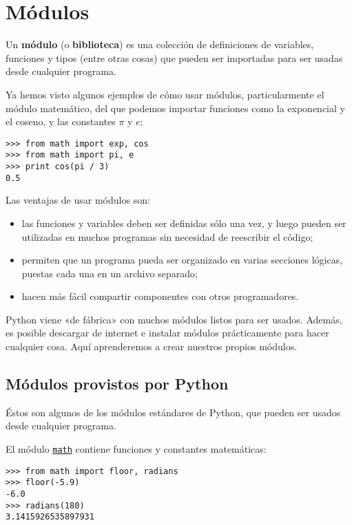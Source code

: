 \chapter{Módulos}

Un \textbf{módulo} (o \textbf{biblioteca}) es una colección de
definiciones de variables, funciones y tipos (entre otras cosas) que
pueden ser importadas para ser usadas desde cualquier programa.

Ya hemos visto algunos ejemplos de cómo usar módulos, particularmente el
módulo matemático, del que podemos importar funciones como la
exponencial y el coseno, y las constantes \(\pi\) y \(e\):

\begin{lstlisting}
>>> from math import exp, cos
>>> from math import pi, e
>>> print cos(pi / 3)
0.5
\end{lstlisting}

Las ventajas de usar módulos son:

\begin{itemize}
\item
  las funciones y variables deben ser definidas sólo una vez, y luego
  pueden ser utilizadas en muchos programas sin necesidad de reescribir
  el código;
\item
  permiten que un programa pueda ser organizado en varias secciones
  lógicas, puestas cada una en un archivo separado;
\item
  hacen más fácil compartir componentes con otros programadores.
\end{itemize}

Python viene «de fábrica» con muchos módulos listos para ser usados.
Además, es posible descargar de internet e instalar módulos
prácticamente para hacer cualquier cosa. Aquí aprenderemos a
crear nuestros propios módulos.

\section{Módulos provistos por Python}

Éstos son algunos de los módulos estándares de Python, que pueden ser
usados desde cualquier programa.

El módulo \href{http://docs.python.org/library/math.html}{\lstinline!math!} contiene
funciones y constantes matemáticas:

\begin{lstlisting}
>>> from math import floor, radians
>>> floor(-5.9)
-6.0
>>> radians(180)
3.1415926535897931
\end{lstlisting}

